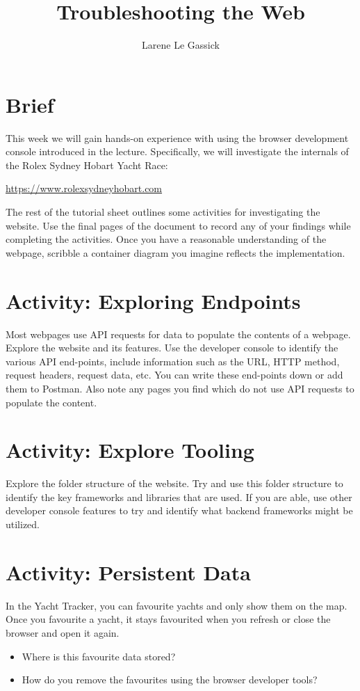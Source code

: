 \documentclass{csse4400}
\title{Troubleshooting the Web}
\author{Larene Le Gassick}
\date{\week{5}}
\begin{document}
\maketitle

\section{Brief}

This week we will gain hands-on experience with using the browser development console introduced in the lecture.
Specifically, we will investigate the internals of the Rolex Sydney Hobart Yacht Race:

\noindent\url{https://www.rolexsydneyhobart.com}

The rest of the tutorial sheet outlines some activities for investigating the website.
Use the final pages of the document to record any of your findings while completing the activities.
Once you have a reasonable understanding of the webpage,
scribble a container diagram you imagine reflects the implementation.

\section{Activity: Exploring Endpoints}
Most webpages use API requests for data to populate the contents of a webpage.
Explore the website and its features.
Use the developer console to identify the various API end-points,
include information such as the URL, HTTP method, request headers, request data, etc.
You can write these end-points down or add them to Postman.
Also note any pages you find which do not use API requests to populate the content.

\section{Activity: Explore Tooling}
Explore the folder structure of the website.
Try and use this folder structure to identify the key frameworks and libraries that are used.
If you are able,
use other developer console features to try and identify what backend frameworks might be utilized.

\section{Activity: Persistent Data}
In the Yacht Tracker,
you can favourite yachts and only show them on the map.
Once you favourite a yacht,
it stays favourited when you refresh or close the browser and open it again.\vspace{-0.6em}
\begin{itemize}
    \setlength\itemsep{-0.5em}
    \item Where is this favourite data stored?
    \item How do you remove the favourites using the browser developer tools?
\end{itemize}
\end{document}
